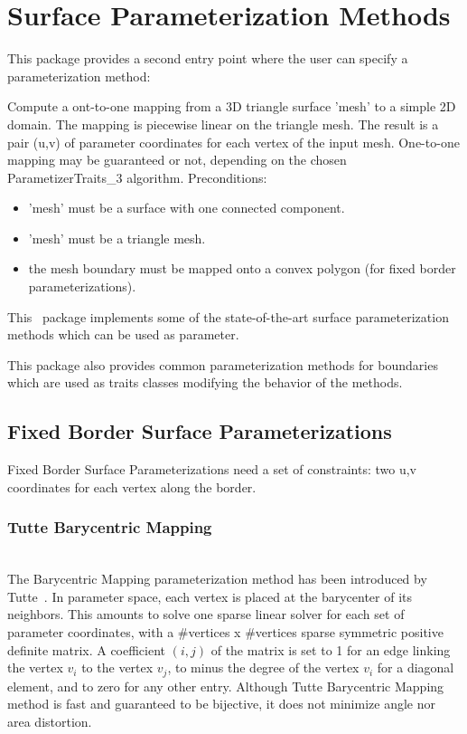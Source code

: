 \section{Surface Parameterization Methods}


This package provides a second  entry point
where the user can specify a parameterization method:

{ Compute a ont-to-one mapping from a 3D triangle surface 'mesh' to a
simple 2D domain. The mapping is piecewise linear on the triangle
mesh. The result is a pair (u,v) of parameter coordinates for each
vertex of the input mesh.  One-to-one mapping may be guaranteed or
not, depending on the chosen ParametizerTraits\_3 algorithm.
Preconditions:\begin{itemize} 
\item 'mesh' must be a surface with one connected component.\item
'mesh' must be a triangle mesh.\item the mesh boundary must be mapped
onto a convex polygon (for fixed border
parameterizations).\end{itemize} }


This \cgal\ package implements some of the state-of-the-art surface
parameterization methods which can be used as
 parameter.

This package also provides common parameterization methods for
boundaries which are used as traits classes modifying the behavior of
the  methods.


\subsection{Fixed Border Surface Parameterizations}

Fixed Border Surface Parameterizations need a set of constraints: two
u,v coordinates for each vertex along the border.

\subsubsection{Tutte Barycentric Mapping}

  \\

The Barycentric Mapping parameterization method has been introduced by
Tutte~\cite{cgal:fh-survey-05}. In parameter space, each vertex is
placed at the barycenter of its neighbors. This amounts to solve one
sparse linear solver for each set of parameter coordinates, with a
\#vertices x \#vertices sparse symmetric positive definite matrix. 
A coefficient $(i,j)$ of the matrix is set to 1 for an edge linking
the vertex $v_i$ to the vertex $v_j$, to minus the degree of the
vertex $v_i$ for a diagonal element, and to zero for any other
entry. Although Tutte Barycentric Mapping method is fast and
guaranteed to be bijective, it does not minimize angle nor area
distortion.

